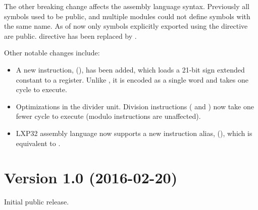 \documentclass[a4paper,12pt,twoside,extrafontsizes]{memoir}
\begin{document}
The other breaking change affects the assembly language syntax. Previously all symbols used to be public, and multiple modules could not define symbols with the same name. As of now only symbols explicitly exported using the  directive are public.  directive has been replaced by .

Other notable changes include:

\begin{itemize}
	\item A new instruction,  (), has been added, which loads a 21-bit sign extended constant to a register. Unlike , it is encoded as a single word and takes one cycle to execute.
	\item Optimizations in the divider unit. Division instructions ( and ) now take one fewer cycle to execute (modulo instructions are unaffected).
	\item LXP32 assembly language now supports a new instruction alias,  (), which is equivalent to .
\end{itemize}

\section*{Version 1.0 (2016-02-20)}

Initial public release.
\end{document}
